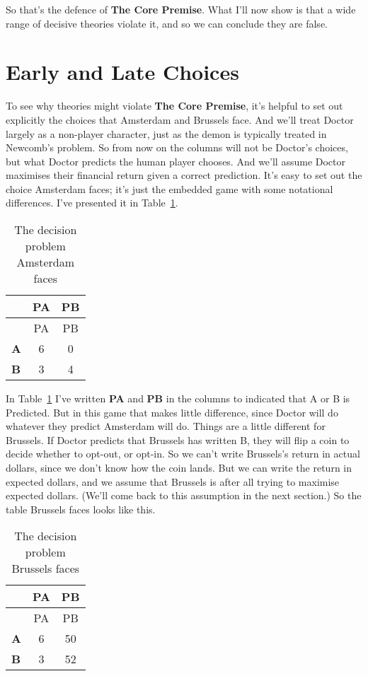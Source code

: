 \documentclass[
  10pt,
  letterpaper,
  DIV=11,
  numbers=noendperiod,
  twoside]{scrartcl}
\begin{document}
So that's the defence of \textbf{The Core Premise}. What I'll now show
is that a wide range of decisive theories violate it, and so we can
conclude they are false.

\section{Early and Late Choices}\label{early-and-late-choices}

To see why theories might violate \textbf{The Core Premise}, it's
helpful to set out explicitly the choices that Amsterdam and Brussels
face. And we'll treat Doctor largely as a non-player character, just as
the demon is typically treated in Newcomb's problem. So from now on the
columns will not be Doctor's choices, but what Doctor predicts the human
player chooses. And we'll assume Doctor maximises their financial return
given a correct prediction. It's easy to set out the choice Amsterdam
faces; it's just the embedded game with some notational differences.
I've presented it in Table~\ref{tbl-main-game-ams}.

\begin{longtable}[]{@{}lcc@{}}
\caption{The decision problem Amsterdam
faces}\label{tbl-main-game-ams}\tabularnewline
\toprule\noalign{}
& PA & PB \\
\midrule\noalign{}
\endfirsthead
\toprule\noalign{}
& PA & PB \\
\midrule\noalign{}
\endhead
\bottomrule\noalign{}
\endlastfoot
\textbf{A} & 6 & 0 \\
\textbf{B} & 3 & 4 \\
\end{longtable}

In Table~\ref{tbl-main-game-ams} I've written \textbf{PA} and
\textbf{PB} in the columns to indicated that A or B is Predicted. But in
this game that makes little difference, since Doctor will do whatever
they predict Amsterdam will do. Things are a little different for
Brussels. If Doctor predicts that Brussels has written B, they will flip
a coin to decide whether to opt-out, or opt-in. So we can't write
Brussels's return in actual dollars, since we don't know how the coin
lands. But we can write the return in expected dollars, and we assume
that Brussels is after all trying to maximise expected dollars. (We'll
come back to this assumption in the next section.) So the table Brussels
faces looks like this.

\begin{longtable}[]{@{}lcc@{}}
\caption{The decision problem Brussels
faces}\label{tbl-main-game-bru}\tabularnewline
\toprule\noalign{}
& PA & PB \\
\midrule\noalign{}
\endfirsthead
\toprule\noalign{}
& PA & PB \\
\midrule\noalign{}
\endhead
\bottomrule\noalign{}
\endlastfoot
\textbf{A} & 6 & 50 \\
\textbf{B} & 3 & 52 \\
\end{longtable}
\end{document}
